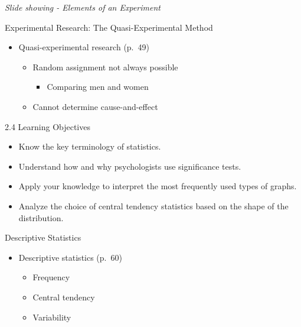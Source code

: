 \documentclass[
]{book}
\providecommand{\tightlist}{%
  \setlength{\itemsep}{0pt}\setlength{\parskip}{0pt}}
\begin{document}
\emph{Slide showing - Elements of an Experiment}

Experimental Research: The Quasi-Experimental Method

\begin{itemize}
\tightlist
\item
  Quasi-experimental research (p.~49)

  \begin{itemize}
  \tightlist
  \item
    Random assignment not always possible

    \begin{itemize}
    \tightlist
    \item
      Comparing men and women\\
    \end{itemize}
  \item
    Cannot determine cause-and-effect
  \end{itemize}
\end{itemize}

2.4 Learning Objectives

\begin{itemize}
\tightlist
\item
  Know the key terminology of statistics.\\
\item
  Understand how and why psychologists use significance tests.\\
\item
  Apply your knowledge to interpret the most frequently used types of graphs.\\
\item
  Analyze the choice of central tendency statistics based on the shape of the distribution.
\end{itemize}

Descriptive Statistics

\begin{itemize}
\tightlist
\item
  Descriptive statistics (p.~60)

  \begin{itemize}
  \tightlist
  \item
    Frequency\\
  \item
    Central tendency\\
  \item
    Variability
  \end{itemize}
\end{itemize}
\end{document}
